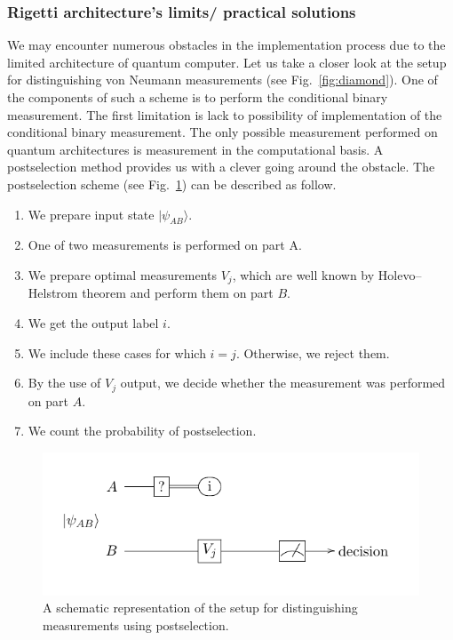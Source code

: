 \documentclass[preprint,12pt, a4paper]{elsarticle}
\newcommand{\ket}[1]{\ensuremath{|#1\rangle}}
\newcommand{\1}{{\rm 1\hspace{-0.9mm}l}}
\begin{document}
\subsubsection{Rigetti architecture's limits/ practical solutions}

We may encounter numerous obstacles in the implementation process due to the 
limited architecture of quantum computer. 
Let us take a closer look at the setup for distinguishing von Neumann 
measurements (see Fig.~\ref{fig:diamond}). One of the components of such a 
scheme is to perform the conditional binary measurement. The first limitation 
is lack to possibility of implementation of the conditional binary measurement. 
The only possible measurement performed on quantum architectures is measurement 
in the computational basis. 
A postselection method provides us with a clever going around the obstacle. The 
postselection  scheme (see Fig.~\ref{postselection})  can be described as 
follow. 


\begin{enumerate}
	\item We prepare input state $\ket{\psi_{AB}}$.
	\item One of two measurements is performed on part A.
	\item We prepare optimal measurements $V_j$, which are well known by 
	Holevo--Helstrom theorem and perform them on part $B$.
	\item We get the output label $i$.
	\item We include these cases for which $i = j$. Otherwise, we reject them.
	\item By the use of $V_j$ output, we decide whether the measurement was 
	performed on part $A$.
	\item We count the probability of postselection.
\end{enumerate}

\begin{figure}[h!]
	\includegraphics[scale=1.5]{onequbit.pdf}
	\caption{A schematic representation of the setup for distinguishing
		measurements using postselection.}
	\label{postselection}
\end{figure} 
\end{document}
